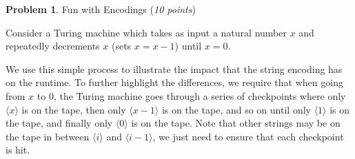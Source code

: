 \documentclass[11pt]{article}
\theoremstyle{definition}
\theoremstyle{theorem}
\newtheorem{prob}{Problem}
\begin{document}
\newpage

\begin{prob} Fun with Encodings (\emph{10 points})\end{prob}

Consider a Turing machine which takes as input a natural number $x$ and repeatedly decrements $x$ (sets $x=x-1$) until $x=0$. 

We use this simple process to illustrate the impact that the string encoding has on the runtime. To further highlight the differences, we require that when going from $x$ to $0$, the Turing machine goes through a series of checkpoints where only $\langle x \rangle$ is on the tape, then only $\langle x-1 \rangle$ is on the tape, and so on until only $\langle 1 \rangle$ is on the tape, and finally only $\langle 0 \rangle$ is on the tape. Note that other strings may be on the tape in between $\langle i \rangle$ and $\langle i-1 \rangle$, we just need to ensure that each checkpoint is hit.
\end{document}
